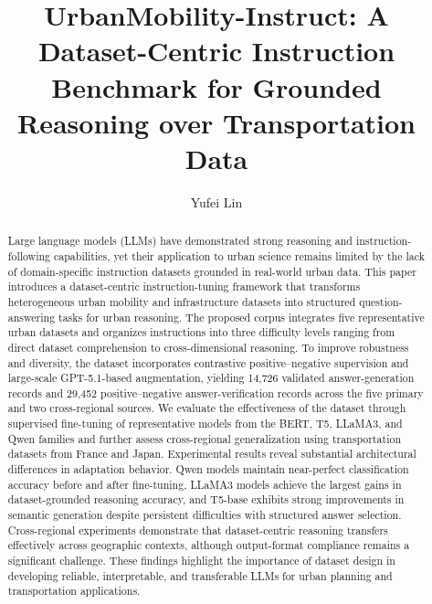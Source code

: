 \documentclass[a4paper,fleqn]{cas-sc}
\begin{document}

\title[mode=title]{UrbanMobility-Instruct: A Dataset-Centric Instruction Benchmark for Grounded Reasoning over Transportation Data}

\author[1]{Yufei Lin}
\cormark[1]



\begin{abstract}
Large language models (LLMs) have demonstrated strong reasoning and instruction-following capabilities, yet their application to urban science remains limited by the lack of domain-specific instruction datasets grounded in real-world urban data. This paper introduces a dataset-centric instruction-tuning framework that transforms heterogeneous urban mobility and infrastructure datasets into structured question-answering tasks for urban reasoning. The proposed corpus integrates five representative urban datasets and organizes instructions into three difficulty levels ranging from direct dataset comprehension to cross-dimensional reasoning. To improve robustness and diversity, the dataset incorporates contrastive positive--negative supervision and large-scale GPT-5.1-based augmentation, yielding 14,726 validated answer-generation records and 29,452 positive--negative answer-verification records across the five primary and two cross-regional sources. We evaluate the effectiveness of the dataset through supervised fine-tuning of representative models from the BERT, T5, LLaMA3, and Qwen families and further assess cross-regional generalization using transportation datasets from France and Japan. Experimental results reveal substantial architectural differences in adaptation behavior. Qwen models maintain near-perfect classification accuracy before and after fine-tuning, LLaMA3 models achieve the largest gains in dataset-grounded reasoning accuracy, and T5-base exhibits strong improvements in semantic generation despite persistent difficulties with structured answer selection. Cross-regional experiments demonstrate that dataset-centric reasoning transfers effectively across geographic contexts, although output-format compliance remains a significant challenge. These findings highlight the importance of dataset design in developing reliable, interpretable, and transferable LLMs for urban planning and transportation applications.
\end{abstract}
\end{document}
